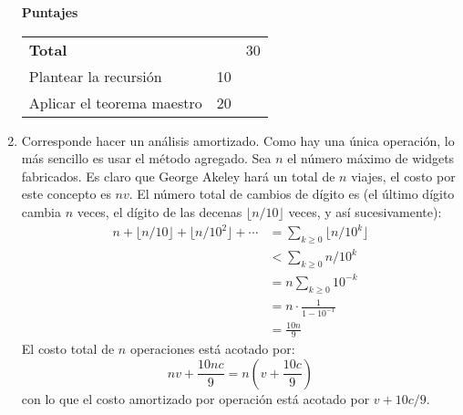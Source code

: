 \documentclass[english, spanish, fleqn]{article}
\begin{document}
\begin{enumerate}
    \vspace*{2\baselineskip}
    \begin{minipage}{1.0\linewidth}
      {\Large\textbf{Puntajes}}\\[0.5\baselineskip]
      \begin{tabular}{lrr}
	\textbf{Total}					     &	  & 30 \\
	Plantear la recursión				     & 10 &    \\
	Aplicar el teorema maestro			     & 20 &
      \end{tabular}
    \end{minipage}
\pagebreak[4]
  \item %
    Corresponde hacer un análisis amortizado.
    Como hay una única operación,
    lo más sencillo es usar el método agregado.
    Sea \(n\) el número máximo de widgets fabricados.
    Es claro que George Akeley hará un total de \(n\) viajes,
    el costo por este concepto es \(n v\).
    El número total de cambios de dígito es
    (el último dígito cambia \(n\) veces,
     el dígito de las decenas \(\lfloor n / 10 \rfloor\) veces,
     y así sucesivamente):
    \begin{align*}
      n + \lfloor n / 10 \rfloor + \lfloor n / 10^2 \rfloor + \dotsb
	&= \sum_{k \ge 0} \lfloor n / 10^k \rfloor \\
	&< \sum_{k \ge 0} n / 10^k \\
	&= n \sum_{k \ge 0} 10^{-k} \\
	&= n \cdot \frac{1}{1 - 10^{-1}} \\
	&= \frac{10 n}{9}
    \end{align*}
    El costo total de \(n\) operaciones está acotado por:
    \begin{equation*}
      n v + \frac{10 n c}{9}
	= n \left( v + \frac{10 c}{9} \right)
    \end{equation*}
    con lo que el costo amortizado por operación está acotado por
    \(v + 10 c / 9\).


\end{enumerate}
\end{document}
